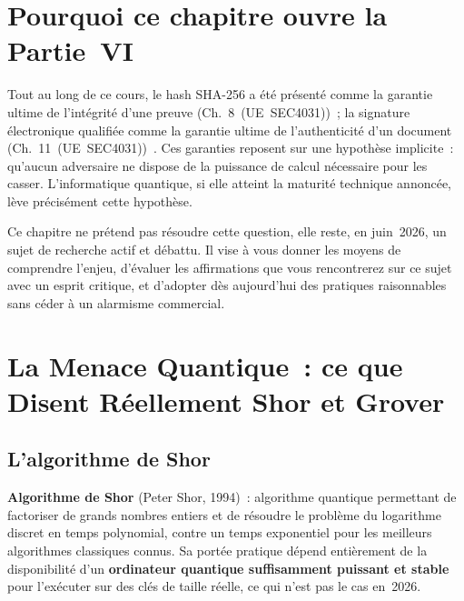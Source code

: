 \bigskip

\section*{Pourquoi ce chapitre ouvre la Partie~VI}

Tout au long de ce cours, le hash SHA-256 a été présenté comme la
garantie ultime de l'intégrité d'une preuve (Ch.~8~(UE~SEC4031))~;
la signature électronique qualifiée comme la garantie ultime de
l'authenticité d'un document (Ch.~11~(UE~SEC4031))~. Ces garanties
reposent sur une hypothèse implicite~: qu'aucun adversaire ne dispose
de la puissance de calcul nécessaire pour les casser. L'informatique
quantique, si elle atteint la maturité technique annoncée, lève
précisément cette hypothèse.

Ce chapitre ne prétend pas résoudre cette question, elle reste,
en juin~2026, un sujet de recherche actif et débattu. Il vise à vous
donner les moyens de comprendre l'enjeu, d'évaluer les affirmations
que vous rencontrerez sur ce sujet avec un esprit critique, et
d'adopter dès aujourd'hui des pratiques raisonnables sans céder
à un alarmisme commercial.

\separateur

\section{La Menace Quantique~: ce que Disent Réellement Shor et Grover}
\label{sec:menace-quantique}

\subsection{L'algorithme de Shor}

\begin{boxdef}
\textbf{Algorithme de Shor} (Peter Shor,
1994)~: algorithme quantique permettant de factoriser de grands
nombres entiers et de résoudre le problème du logarithme discret
en temps polynomial, contre un temps exponentiel pour les
meilleurs algorithmes classiques connus. Sa portée pratique dépend
entièrement de la disponibilité d'un \textbf{ordinateur quantique
suffisamment puissant et stable} pour l'exécuter sur des clés de
taille réelle, ce qui n'est pas le cas en~2026.
\end{boxdef}

